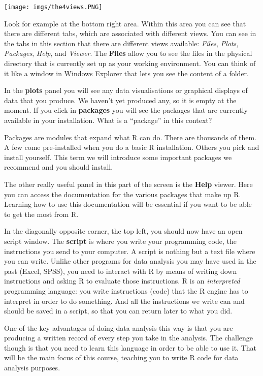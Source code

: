 \documentclass[
]{book}
\begin{document}
\texttt{[image: imgs/the4views.PNG]}

Look for example at the bottom right area. Within this area you can see that there are different tabs, which are associated with different views. You can see in the tabs in this section that there are different views available: \emph{Files}, \emph{Plots}, \emph{Packages}, \emph{Help}, and \emph{Viewer}. The \textbf{Files} allow you to see the files in the physical directory that is currently set up as your working environment. You can think of it like a window in Windows Explorer that lets you see the content of a folder.

In the \textbf{plots} panel you will see any data visualisations or graphical displays of data that you produce. We haven't yet produced any, so it is empty at the moment. If you click in \textbf{packages} you will see the packages that are currently available in your installation. What is a ``package'' in this context?

Packages are modules that expand what R can do. There are thousands of them. A few come pre-installed when you do a basic R installation. Others you pick and install yourself. This term we will introduce some important packages we recommend and you should install.

The other really useful panel in this part of the screen is the \textbf{Help} viewer. Here you can access the documentation for the various packages that make up R. Learning how to use this documentation will be essential if you want to be able to get the most from R.

In the diagonally opposite corner, the top left, you should now have an open script window. The \textbf{script} is where you write your programming code, the instructions you send to your computer. A script is nothing but a text file where you can write. Unlike other programs for data analysis you may have used in the past (Excel, SPSS), you need to interact with R by means of writing down instructions and asking R to evaluate those instructions. R is an \emph{interpreted} programming language: you write instructions (code) that the R engine has to interpret in order to do something. And all the instructions we write can and should be saved in a script, so that you can return later to what you did.

One of the key advantages of doing data analysis this way is that you are producing a written record of every step you take in the analysis. The challenge though is that you need to learn this language in order to be able to use it. That will be the main focus of this course, teaching you to write R code for data analysis purposes.
\end{document}
